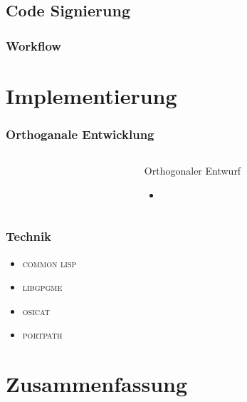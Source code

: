 \documentclass[german]{beamer}
\newcommand{\COMMONLISP}{\textsc{common lisp}}
\newcommand{\LIBGPGME}{\textsc{libgpgme}}
\newcommand{\OSICAT}{\textsc{osicat}}
\newcommand{\PORTPATH}{\textsc{portpath}}
\begin{document}
\subsection{Code Signierung}

\begin{frame}
  \frametitle{Workflow}
  
\end{frame}

\section{Implementierung}

\begin{frame}
  \frametitle{Orthoganale Entwicklung}
  \begin{columns}
    \begin{column}{5cm}
      
    \end{column}
    \begin{column}{7cm}
      \begin{block}{Orthogonaler Entwurf}
        \begin{itemize}
        \item
        \end{itemize}
      \end{block}

    \end{column}
  \end{columns}
\end{frame}

\begin{frame}
  \frametitle{Technik}
  \begin{itemize}
  \item \COMMONLISP{}
  \item \LIBGPGME{}
  \item \OSICAT{}
  \item \PORTPATH{}
  \end{itemize}
\end{frame}

\section{Zusammenfassung}
\end{document}
